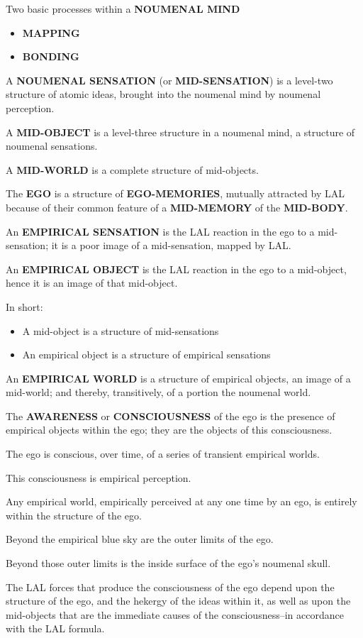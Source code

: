 \documentclass[11pt]{article}
\begin{document}
Two basic processes within a \textbf{NOUMENAL MIND}
\begin{itemize}
\item \textbf{MAPPING}
\item \textbf{BONDING}
\end{itemize}
A \textbf{NOUMENAL SENSATION} (or \textbf{MID-SENSATION}) is a level-two
structure of atomic ideas, brought into the noumenal mind
by noumenal perception.

A \textbf{MID-OBJECT} is a level-three structure in a noumenal mind,
a structure of noumenal sensations.

A \textbf{MID-WORLD} is a complete structure of mid-objects. 

The \textbf{EGO} is a structure of \textbf{EGO-MEMORIES}, mutually
attracted by LAL because of their common feature of
a \textbf{MID-MEMORY} of the \textbf{MID-BODY}.

An \textbf{EMPIRICAL SENSATION} is the LAL reaction in the ego
to a mid-sensation; it is a poor image of a mid-sensation,
mapped by LAL.

An \textbf{EMPIRICAL OBJECT} is the LAL reaction in the ego to a
mid-object, hence it is an image of that mid-object.

In short:
\begin{itemize}
\item A mid-object is a structure of mid-sensations
\item An empirical object is a structure of empirical sensations
\end{itemize}
An \textbf{EMPIRICAL WORLD} is a structure of empirical objects, an
image of a mid-world; and thereby, transitively, of a portion
the noumenal world.

The \textbf{AWARENESS} or \textbf{CONSCIOUSNESS} of the ego is the
presence of empirical objects within the ego; they are the objects
of this consciousness.

The ego is conscious, over time, of a series of transient empirical worlds.

This consciousness is empirical perception.

Any empirical world, empirically perceived at any one time by an ego,
is entirely within the structure of the ego.

Beyond the empirical blue sky are the outer limits of the ego.

Beyond those outer limits is the inside surface of the ego's noumenal skull.

The LAL forces that produce the consciousness of the ego
depend upon the structure of the ego, and the hekergy of the 
ideas within it, as well as upon the mid-objects that are 
the immediate causes of the consciousness--in accordance
with the LAL formula.
\end{document}
